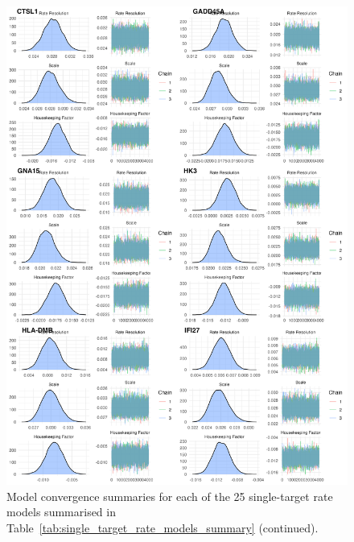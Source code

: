\documentclass[../thesis.tex]{subfiles}
\begin{document}
\begin{figure}
    \centering
    \includegraphics[width=\textwidth]{figures/chapter2/model_summaries_6.png}
    \caption{Model convergence summaries for each of the 25 single-target rate models summarised in Table~\ref{tab:single_target_rate_models_summary} (continued).}
    \label{fig:convergence_6}
\end{figure}
\end{document}
